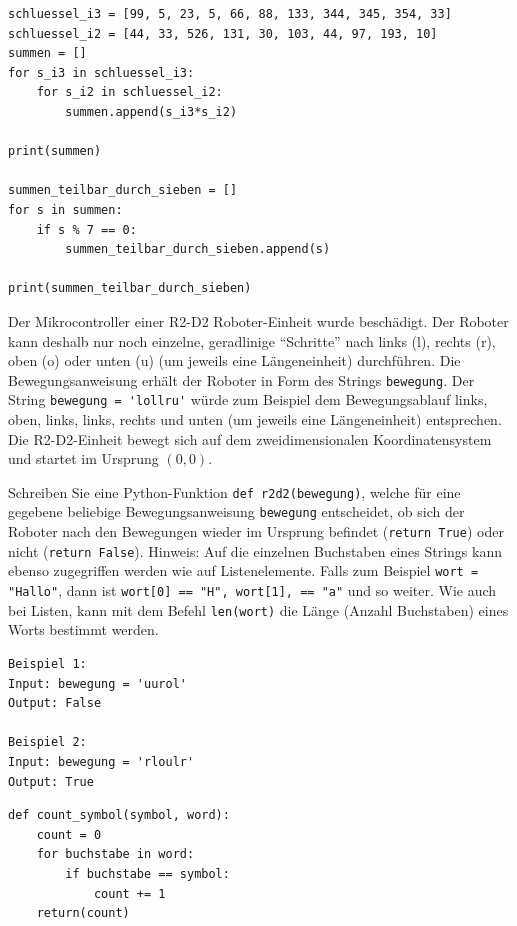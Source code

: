 \begin{questions}
\begin{solution}
\begin{lstlisting}
schluessel_i3 = [99, 5, 23, 5, 66, 88, 133, 344, 345, 354, 33]
schluessel_i2 = [44, 33, 526, 131, 30, 103, 44, 97, 193, 10]
summen = []
for s_i3 in schluessel_i3:
    for s_i2 in schluessel_i2:
        summen.append(s_i3*s_i2)

print(summen)

summen_teilbar_durch_sieben = []
for s in summen:
    if s % 7 == 0:
        summen_teilbar_durch_sieben.append(s)

print(summen_teilbar_durch_sieben)
\end{lstlisting}
\end{solution}

\clearpage
{}

Der Mikrocontroller einer R2-D2 Roboter-Einheit wurde beschädigt. Der Roboter kann deshalb nur noch einzelne, geradlinige \enquote{Schritte} nach links (l), rechts (r), oben (o) oder unten (u) (um jeweils eine Längeneinheit) durchführen. Die Bewegungsanweisung erhält der Roboter in Form des Strings \lstinline|bewegung|. Der String \lstinline|bewegung = 'lollru'| würde zum Beispiel dem Bewegungsablauf links, oben, links, links, rechts und unten (um jeweils eine Längeneinheit) entsprechen. Die R2-D2-Einheit bewegt sich auf dem zweidimensionalen Koordinatensystem und startet im Ursprung $(0,0)$.

\noindent
Schreiben Sie eine Python-Funktion \lstinline|def r2d2(bewegung)|, welche für eine gegebene beliebige Be\-we\-gungs\-an\-wei\-sung \lstinline|bewegung| entscheidet, ob sich der Roboter nach den Bewegungen wieder im Ursprung befindet (\lstinline|return True|) oder nicht (\lstinline|return False|). Hinweis: Auf die einzelnen Buchstaben eines Strings kann ebenso zugegriffen werden wie auf Listenelemente. Falls zum Beispiel \lstinline|wort = "Hallo"|, dann ist \lstinline|wort[0] == "H", wort[1], == "a"| und so weiter. Wie auch bei Listen, kann mit dem Befehl \lstinline|len(wort)| die Länge (Anzahl Buchstaben) eines Worts bestimmt werden.

\begin{lstlisting}[numbers=none,framexleftmargin=0em,xleftmargin=0em]
Beispiel 1:
Input: bewegung = 'uurol'
Output: False

Beispiel 2:
Input: bewegung = 'rloulr'
Output: True
\end{lstlisting}

\begin{solution}
\begin{lstlisting}
def count_symbol(symbol, word):
    count = 0
    for buchstabe in word:
        if buchstabe == symbol:
            count += 1
    return(count)



\end{lstlisting}
\end{solution}
\end{questions}

